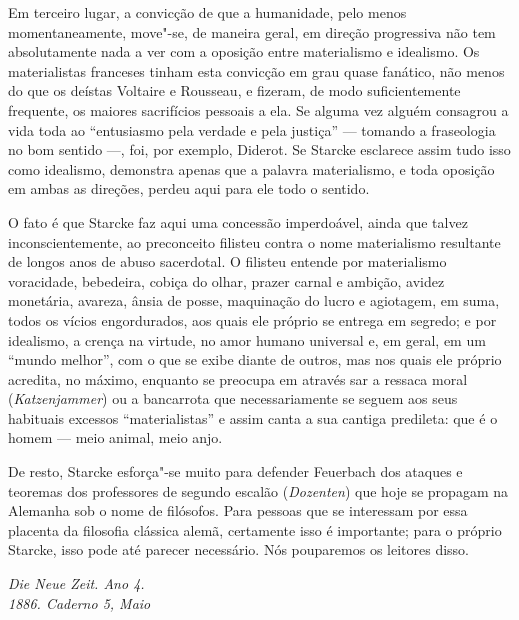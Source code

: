 Em terceiro lugar, a convicção de que a humanidade, pelo menos
momentaneamente, move"-se, de maneira geral, em direção progressiva não
tem absolutamente nada a ver com a oposição entre materialismo e
idealismo. Os materialistas franceses tinham esta convicção em grau
quase fanático, não menos do que os
deístas Voltaire e Rousseau,
e fizeram, de modo suficientemente frequente, os maiores sacrifícios
pessoais a ela. Se alguma vez alguém consagrou a vida toda ao
``entusiasmo pela verdade e pela justiça'' --- tomando a fraseologia no
bom sentido ---, foi, por
exemplo, Diderot. Se Starcke esclarece
assim tudo isso como idealismo, demonstra apenas que a palavra
materialismo, e toda oposição em ambas as direções, perdeu aqui para ele
todo o sentido.

O fato é que Starcke faz aqui uma concessão imperdoável, ainda que
talvez inconscientemente, ao preconceito filisteu contra o nome
materialismo resultante de longos anos de abuso sacerdotal. O filisteu
entende por materialismo voracidade, bebedeira, cobiça do olhar, prazer
carnal e ambição, avidez monetária, avareza, ânsia de posse, maquinação
do lucro e agiotagem, em suma, todos os vícios engordurados, aos quais
ele próprio se entrega em segredo; e por idealismo, a crença na virtude,
no amor humano universal e, em geral, em um ``mundo melhor'', com o que
se exibe diante de outros, mas nos quais ele próprio acredita, no
máximo, enquanto se preocupa em através sar a ressaca moral
(\emph{Katzenjammer}) ou a bancarrota que necessariamente se seguem aos
seus habituais excessos ``materialistas'' e assim canta a sua cantiga
predileta: que é o homem --- meio animal, meio anjo.

De resto, Starcke esforça"-se muito para
defender Feuerbach dos
ataques e teoremas dos professores de segundo escalão (\emph{Dozenten})
que hoje se propagam na Alemanha sob o nome de filósofos. Para pessoas
que se interessam por essa placenta da filosofia clássica alemã,
certamente isso é importante; para o próprio Starcke, isso pode até
parecer necessário. Nós pouparemos os leitores disso.

\quebra

\begin{flushright}
\emph{Die Neue Zeit. Ano 4.}\\
\emph{1886. Caderno 5, Maio}
\end{flushright}

\vspace{2cm}

